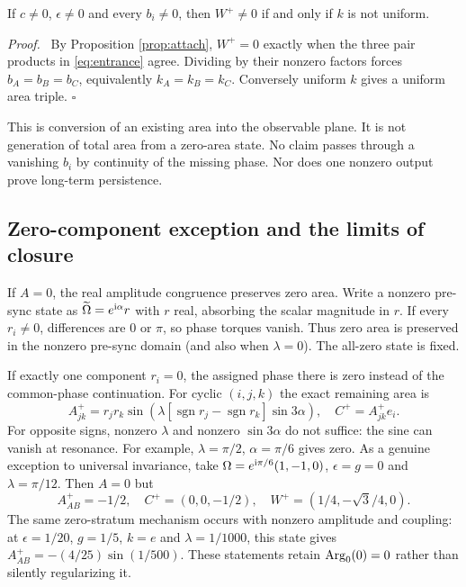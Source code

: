\documentclass[11pt,a4paper]{article}
\newenvironment{proof}{\par\textit{Proof.}\ }{\hfill$\square$\par}
\begin{document}
\begin{proposition}
If $c\ne0$, $\epsilon\ne0$ and every $b_i\ne0$, then $W^+\ne0$ if and only if $k$ is not uniform.
\end{proposition}
\begin{proof}
By Proposition \ref{prop:attach}, $W^+=0$ exactly when the three pair products in \eqref{eq:entrance} agree. Dividing by their nonzero factors forces $b_A=b_B=b_C$, equivalently $k_A=k_B=k_C$. Conversely uniform $k$ gives a uniform area triple.
\end{proof}
This is conversion of an existing area into the observable plane. It is not generation of total area from a zero-area state. No claim passes through a vanishing $b_i$ by continuity of the missing phase. Nor does one nonzero output prove long-term persistence.

\subsection{Zero-component exception and the limits of closure}
If $A=0$, the real amplitude congruence preserves zero area. Write a nonzero pre-sync state as $\widetilde{\Omega}=e^{\mathrm i\alpha}r$ with $r$ real, absorbing the scalar magnitude in $r$. If every $r_i\ne0$, differences are $0$ or $\pi$, so phase torques vanish. Thus zero area is preserved in the nonzero pre-sync domain (and also when $\lambda=0$). The all-zero state is fixed.

If exactly one component $r_i=0$, the assigned phase there is zero instead of the common-phase continuation. For cyclic $(i,j,k)$ the exact remaining area is
\begin{equation}
 A_{jk}^+=r_jr_k\sin\!\left(\lambda[\operatorname{sgn}r_j-\operatorname{sgn}r_k]\sin3\alpha\right),\quad
 C^+=A_{jk}^+e_i.\label{eq:zeroexception}
\end{equation}
For opposite signs, nonzero $\lambda$ and nonzero $\sin3\alpha$ do not suffice: the sine can vanish at resonance. For example, $\lambda=\pi/2$, $\alpha=\pi/6$ gives zero. As a genuine exception to universal invariance, take $\Omega=e^{\mathrm i\pi/6}(1,-1,0)$, $\epsilon=g=0$ and $\lambda=\pi/12$. Then $A=0$ but
\begin{equation}
 A_{AB}^+=-1/2,\quad C^+=(0,0,-1/2),\quad W^+=(1/4,-\sqrt3/4,0).
\end{equation}
The same zero-stratum mechanism occurs with nonzero amplitude and coupling: at $\epsilon=1/20$, $g=1/5$, $k=e$ and $\lambda=1/1000$, this state gives $A_{AB}^+=-(4/25)\sin(1/500)$. These statements retain $\operatorname{Arg}_0(0)=0$ rather than silently regularizing it.
\end{document}
